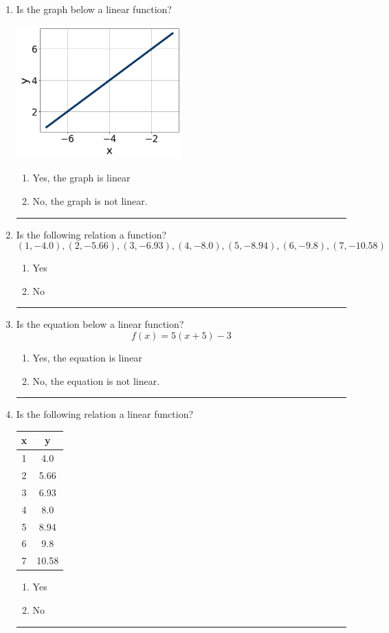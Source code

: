 \documentclass[14pt]{extbook}
\newcommand{\litem}[1]{\item#1\hspace*{-1cm}\rule{\textwidth}{0.4pt}}
\begin{document}
\begin{enumerate}
{\begin{enumerate}[label=\Alph*.]
\end{enumerate} }
\litem{
Is the graph below a linear function?
\begin{center}
    \includegraphics[width=0.5\textwidth]{../Figures/MA_8_F_1_2_graphK.png}
\end{center}
\begin{enumerate}[label=\Alph*.]
\item Yes, the graph is linear
\item No, the graph is not linear.

\end{enumerate} }
\litem{
Is the following relation a function?\[ (1, -4.0), (2, -5.66), (3, -6.93), (4, -8.0), (5, -8.94), (6, -9.8), (7, -10.58) \]\begin{enumerate}[label=\Alph*.]
\item Yes
\item No

\end{enumerate} }
\litem{
Is the equation below a linear function?\[ f(x) = 5(x + 5)-3 \]\begin{enumerate}[label=\Alph*.]
\item Yes, the equation is linear
\item No, the equation is not linear.

\end{enumerate} }
\litem{
Is the following relation a linear function?

\begin{tabular}{c|c}
x &y\tabularnewline \hline
1 &4.0\tabularnewline \hline
2 &5.66\tabularnewline \hline
3 &6.93\tabularnewline \hline
4 &8.0\tabularnewline \hline
5 &8.94\tabularnewline \hline
6 &9.8\tabularnewline \hline
7 &10.58\end{tabular}\begin{enumerate}[label=\Alph*.]
\item Yes
\item No


\end{enumerate}}
\end{enumerate}
\end{document}
